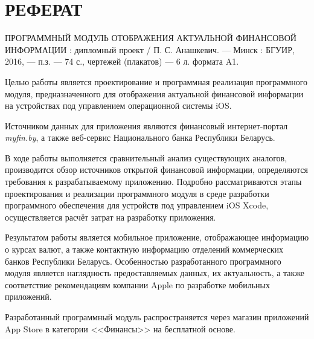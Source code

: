 \section*{РЕФЕРАТ}
\thispagestyle{empty}

ПРОГРАММНЫЙ МОДУЛЬ ОТОБРАЖЕНИЯ АКТУАЛЬНОЙ ФИНАНСОВОЙ ИНФОРМАЦИИ :
дипломный проект / П. С. Анашкевич. --- Минск : БГУИР, 2016, --- п.з. ---
74 с., чертежей (плакатов) --- 6 л. формата A1.

Целью работы является проектирование и программная реализация программного модуля,
предназначенного для отображения актуальной финансовой информации на устройствах
под управлением операционной системы iOS.

Источником данных для приложения являются финансовый
интернет-портал \textit{myfin.by}, а также веб-сервис Национального банка
Республики Беларусь.

В ходе работы выполняется сравнительный анализ существующих аналогов,
производится обзор источников открытой финансовой информации, определяются
требования к разрабатываемому приложению. Подробно рассматриваются этапы проектирования
и реализации программного модуля в среде разработки программного обеспечения
для устройств под управлением iOS Xcode, осуществляется расчёт затрат
на разработку приложения.

Результатом работы является мобильное приложение, отображающее информацию о
курсах валют, а также контактную информацию отделений коммерческих банков
Республики Беларусь. Особенностью разработанного программного модуля является
наглядность предоставляемых данных, их актуальность, а также соответствие
рекомендациям компании Apple по разработке мобильных приложений.

Разработанный программный модуль распространяется через магазин приложений App Store
в категории <<Финансы>> на бесплатной основе.

\pagebreak
